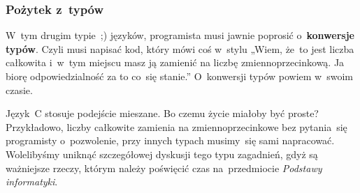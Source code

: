 \documentclass[10pt,t]{beamer}
\begin{document}
\begin{frame}
  \frametitle{Pożytek z~typów}


  W~tym drugim typie~;) języków, programista musi jawnie poprosić
  o~\textbf{konwersje typów}. Czyli musi napisać kod, który mówi coś
  w~stylu „Wiem, że~to jest liczba całkowita i~w~tym miejscu masz
  ją zamienić na liczbę zmiennoprzecinkową. Ja biorę odpowiedzialność
  za to co~się stanie.” O~konwersji typów powiem w~swoim czasie.

  Język~C stosuje podejście mieszane. Bo czemu życie miałoby być proste?
  Przykładowo, liczby całkowite zamienia na zmiennoprzecinkowe bez
  pytania~się programisty o~pozwolenie, przy innych typach musimy~się sami
  napracować. Wolelibyśmy uniknąć szczegółowej dyskusji tego typu zagadnień,
  gdyż są ważniejsze rzeczy, którym należy poświęcić czas na~przedmiocie
  \textit{Podstawy informatyki}.

\end{frame}










































\printbibliography





\end{document}

